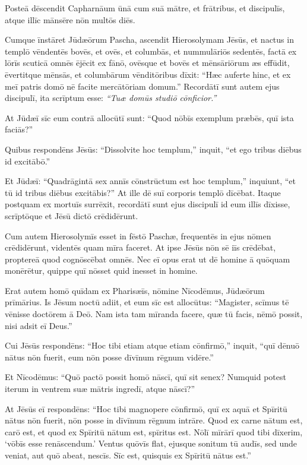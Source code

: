 \Versus Posteā dēscendit Capharnāum ūnā cum suā mātre, et frātribus, et discipulīs, atque illīc mānsēre nōn multōs diēs.

\Versus Cumque īnstāret Jūdæōrum Pascha, ascendit Hierosolymam Jēsūs,
\Versus et nactus in templō vēndentēs bovēs, et ovēs, et columbās, et nummulāriōs sedentēs,
\Versus factā ex lōrīs scuticā omnēs ējēcit ex fānō, ovēsque et bovēs et mēnsāriōrum æs effūdit, ēvertitque mēnsās,
\Versus et columbārum vēnditōribus dīxit: ``Hæc auferte hinc, et ex meī patris domō nē facite mercātōriam domum.''
\Versus Recordātī sunt autem ejus discipulī, ita scrīptum esse: \emph{``Tuæ domūs studiō cōnficior.''}

\Versus At Jūdæī sīc eum contrā allocūtī sunt: ``Quod nōbīs exemplum præbēs, quī ista faciās?''

\Versus Quibus respondēns Jēsūs: ``Dissolvite hoc templum,'' inquit, ``et ego tribus diēbus id excitābō.''

\Versus Et Jūdæī: ``Quadrāgintā sex annīs cōnstrūctum est hoc templum,'' inquiunt, ``et tū id tribus diēbus excitābis?''
\Versus At ille dē suī corporis templō dīcēbat.
\Versus Itaque postquam ex mortuīs surrēxit, recordātī sunt ejus discipulī id eum illīs dīxisse, scrīptōque et Jēsū dictō crēdidērunt.

\Versus Cum autem Hierosolymīs esset in fēstō Paschæ, frequentēs in ejus nōmen crēdidērunt, videntēs quam mīra faceret.
\Versus At ipse Jēsūs nōn sē iīs crēdēbat, proptereā quod cognōscēbat omnēs.
\Versus Nec eī opus erat ut dē homine ā quōquam monērētur, quippe quī nōsset quid inesset in homine.


\Caput
\Versus Erat autem homō quīdam ex Pharisæīs, nōmine Nīcodēmus, Jūdæōrum prīmārius.
\Versus Is Jēsum noctū adiit, et eum sīc est allocūtus: ``Magister, scīmus tē vēnisse doctōrem ā Deō. Nam ista tam mīranda facere, quæ tū facis, nēmō possit, nisi adsit eī Deus.''

\Versus Cui Jēsūs respondēns: ``Hoc tibi etiam atque etiam cōnfirmō,'' inquit, ``quī dēnuō nātus nōn fuerit, eum nōn posse dīvīnum rēgnum vidēre.''

\Versus Et Nīcodēmus: ``Quō pactō possit homō nāscī, quī sit senex? Numquid potest iterum in ventrem suæ mātris ingredī, atque nāscī?''

\Versus At Jēsūs eī respondēns: ``Hoc tibi magnopere cōnfirmō, quī ex aquā et Spīritū nātus nōn fuerit, nōn posse in dīvīnum rēgnum intrāre.
\Versus Quod ex carne nātum est, carō est, et quod ex Spīritū nātum est, spīritus est.
\Versus Nōlī mīrārī quod tibi dīxerim, `vōbīs esse renāscendum.'
\Versus Ventus quōvīs flat, ejusque sonitum tū audīs, sed unde veniat, aut quō abeat, nescīs. Sīc est, quisquis ex Spīritū nātus est.''

